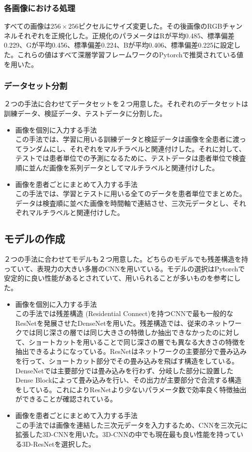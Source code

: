 \subsubsection{各画像における処理}
すべての画像は$256 \times 256$ピクセルにサイズ変更した。その後画像のRGBチャンネルそれぞれを正規化した。正規化のパラメータはRが平均0.485、標準偏差0.229、Gが平均0.456、標準偏差0.224、Bが平均0.406、標準偏差0.225に設定した。これらの値はすべて深層学習フレームワークのPytorchで推奨されている値を用いた。
\subsubsection{データセット分割}
２つの手法に合わせてデータセットを２つ用意した。それぞれのデータセットは訓練データ、検証データ、テストデータに分割した。
\begin{itemize}
    \item 画像を個別に入力する手法\\
この手法では、学習に用いる訓練データと検証データは画像を全患者に渡ってランダムにし、それぞれをマルチラベルと関連付けした。それに対して、テストでは患者単位での予測になるために、テストデータは患者単位で検査順に並んだ画像を系列データとしてマルチラベルと関連付けした。
    \item 画像を患者ごとにまとめて入力する手法\\
この手法では、学習とテストに用いる全てのデータを患者単位でまとめた。データは検査順に並べた画像を時間軸で連結させ、三次元データとし、それぞれマルチラベルと関連付けした。
\end{itemize}
\subsection{モデルの作成}
２つの手法に合わせてモデルも２つ用意した。どちらのモデルでも残差構造を持っていて、表現力の大きい多層のCNNを用いている。モデルの選択はPytorchで安定的に良い性能があるとされていて、用いられることが多いものを参考にした。
\begin{itemize}
    \item 画像を個別に入力する手法\\
この手法では残差構造 (Residential Connect)を持つCNNで最も一般的なResNetを発展させたDenseNetを用いた。残差構造では、従来のネットワークでは同じ深さの層では同じ大きさの特徴しか抽出できなかったのに対して、ショートカットを用いることで同じ深さの層でも異なる大きさの特徴を抽出できるようになっている。ResNetはネットワークの主要部分で畳み込みを行って、ショートカット部分でその畳み込みを飛ばす構造をしている。DenseNetでは主要部分では畳み込みを行わず、分岐した部分に設置したDense Blockによって畳み込みを行い、その出力が主要部分で合流する構造をしている。これによりResNetより少ないパラメータ数で効率良く特徴抽出ができることが確認されている。
    \item 画像を患者ごとにまとめて入力する手法\\
この手法では画像を連結した三次元データを入力するため、CNNを三次元に拡張した3D-CNNを用いた。3D-CNNの中でも現在最も良い性能を持っている3D-ResNetを選択した。
\end{itemize}
